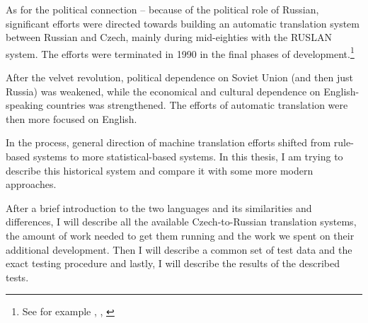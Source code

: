 As for the political connection -- because of the 
political role of Russian,
 significant efforts were directed towards building an automatic translation system between Russian and Czech, mainly during mid-eighties with the RUSLAN system. The efforts were terminated in 1990 in the final phases of development.\footnote{See for example \cite{recycled}, \cite{hajic1987}, \cite{olivaruslan}} 

After the velvet revolution, political dependence on Soviet Union (and then just Russia) was weakened, while the economical and cultural dependence on English-speaking countries was strengthened. The efforts of automatic translation were then more focused on English. 

In the process, general direction of machine translation efforts shifted from rule-based systems to more statistical-based systems. In this thesis, I am trying to describe this historical system and compare it with some more modern approaches.


After a brief introduction to the two languages and its similarities and differences, I will describe all the available Czech-to-Russian translation systems, the amount of work needed to get them running and the work we spent on their additional development. Then I will describe a common set of test data and the exact testing procedure and lastly, I will describe the results of the described tests.



